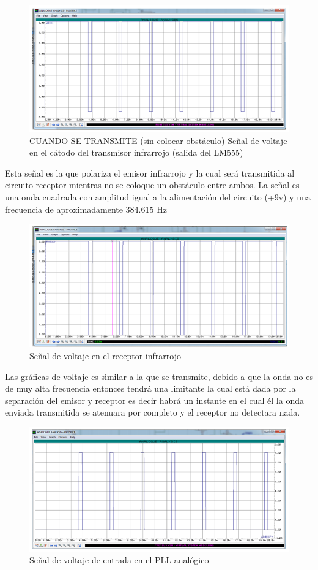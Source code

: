 \documentclass[a4paper,11pt]{article}
\begin{document}
\begin{figure}[h]
	\caption{CUANDO SE TRANSMITE (sin colocar obstáculo) 
	Señal de voltaje en el cátodo del transmisor  infrarrojo (salida del LM555)
	}
	\centering
	\includegraphics[width=0.8\linewidth]{./26}
\end{figure}

Esta señal es la que polariza el emisor infrarrojo y la cual será transmitida al circuito receptor mientras no se coloque un obstáculo entre ambos. La señal es una onda cuadrada con amplitud igual a la alimentación del circuito (+9v)  y una frecuencia de aproximadamente 384.615 Hz

\newpage
\begin{figure}[h]
	\caption{Señal de voltaje en el receptor infrarrojo
	}
	\centering
	\includegraphics[width=0.7\linewidth]{./27}
\end{figure}

Las gráficas de voltaje es similar a la que se transmite, debido a que la onda no es de muy alta frecuencia entonces tendrá una limitante la cual está dada por la separación del emisor y receptor es decir habrá un instante en el cual él la onda enviada transmitida se atenuara por completo y el receptor no detectara nada.

\begin{figure}[h]
	\caption{Señal de voltaje de entrada en el PLL analógico
	}
	\centering
	\includegraphics[width=0.7\linewidth]{./28}
\end{figure}
\end{document}
